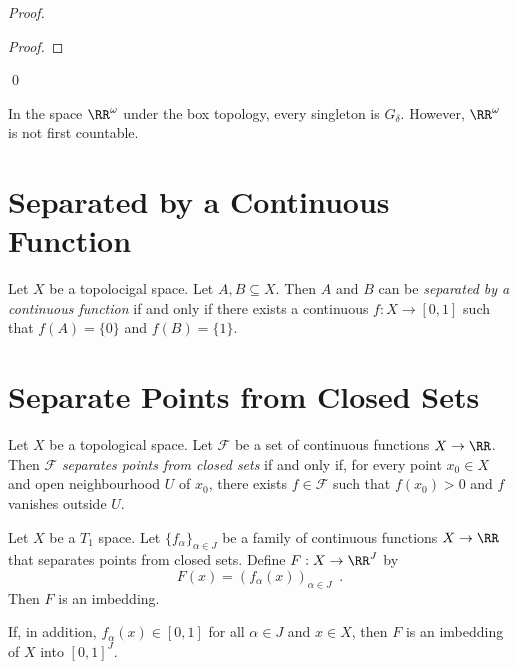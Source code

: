 \begin{proof}
    \pf
    \begin{proof}
    \end{proof}
    \qed
\end{proof}

\begin{example}
    In the space $\RR^\omega$ under the box topology, every singleton is $G_\delta$.
    However, $\RR^\omega$ is not first countable.
\end{example}

\section{Separated by a Continuous Function}

\begin{definition}
    Let $X$ be a topolocigal space. Let $A, B \subseteq X$. Then $A$ and $B$
    can be \emph{separated by a continuous function} if and only if there exists
    a continuous $f : X \rightarrow [0,1]$ such that $f(A) = \{0\}$ and
    $f(B) = \{1\}$.
\end{definition}

\section{Separate Points from Closed Sets}

\begin{definition}
    Let $X$ be a topological space. Let $\mathcal{F}$ be a set of continuous
    functions $X \rightarrow \RR$. Then $\mathcal{F}$ \emph{separates points
    from closed sets} if and only if, for every point $x_0 \in X$
    and open neighbourhood $U$ of $x_0$, there exists $f \in \mathcal{F}$
    such that $f(x_0) > 0$ and $f$ vanishes outside $U$.
\end{definition}

\begin{theorem}
    Let $X$ be a $T_1$ space. Let $\{ f_\alpha \}_{\alpha \in J}$ be a family of
    continuous functions $X \rightarrow \RR$ that separates points from
    closed sets. Define $F : X
    \rightarrow \RR^J$ by
    \[ F(x) = (f_\alpha(x))_{\alpha \in J} \enspace . \]
    Then $F$ is an imbedding.

    If, in addition, $f_\alpha(x) \in [0,1]$ for all $\alpha \in J$ and $x \in X$,
    then $F$ is an imbedding of $X$ into $[0,1]^J$.
\end{theorem}

